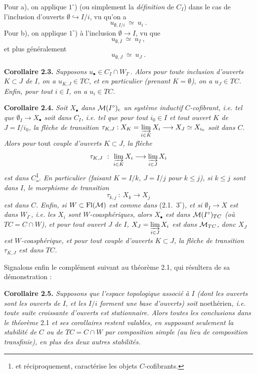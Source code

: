 Pour a), on applique $1^\circ$) (ou simplement la \textit{définition} de $C_I$) dans le cas de l'inclusion d'ouverts $\emptyset \hookrightarrow I/i$, vu qu'on a
\[
u_{\emptyset,I/i} \ \simeq\ u_i \ .
\]
Pour b), on applique $1^\circ$) à l'inclusion $\emptyset \longrightarrow I$, vu que
\[
u_{\emptyset,I} \ \simeq\ u_I \ ,
\]
et plus généralement
\[
u_{\emptyset,J} \ \simeq\ u_J \ .
\]

\textbf{Corollaire 2.3.} \textit{Supposons $u_\bullet \in C_I \cap W_{I^\circ}$. Alors pour toute inclusion d'ouverts $K \subset J$ de $I$, on a $u_{K,J} \in TC$, et en particulier (prenant $K = \emptyset$), on a $u_J \in TC$. Enfin, pour tout $i \in I$, on a $u_i \in TC$.}

\textbf{Corollaire 2.4.} \textit{Soit $X_\bullet$ dans $\mathcal{M}(I^\circ)_{\mathrm{c}}$ un système inductif $C$-cofibrant, i.e. tel que $\emptyset_I \longrightarrow X_\bullet$ soit dans $C_I$, i.e. tel que pour tout $i_0 \in I$ et tout ouvert $K$ de $J = I/i_0$, la flèche de transition $\tau_{K,J} : X_K = \varinjlim\limits_{i\in K} X_i \longrightarrow X_J \simeq X_{i_0}$ soit dans $C$. Alors pour} \textup{tout} \textit{couple d'ouverts $K \subset J$, la flèche}
\[
\tau_{K,J} \ :\ \varinjlim_{i\in K} X_i \longrightarrow \varinjlim_{i\in J} X_i
\]
\textit{est dans $C$}\footnote[12]{et réciproquement, caractérise les objets $C$-cofibrants.}\textit{. En particulier (faisant $K = I/k$, $J = I/j$ pour $k \leq j$), si $k \leq j$ sont dans $I$, le morphisme de transition}
\[
\tau_{k,j} \ :\ X_k \longrightarrow X_j
\]
\textit{est dans $C$. Enfin, si $W \subset \mathrm{Fl}(\mathcal{M})$ est comme dans} \textup{(2.1.\ $3^\circ$)}\textit{, et si $\emptyset_I \longrightarrow X$ est dans $W_{I^\circ}$, i.e. les $X_i$ sont $W$-coasphériques, alors $X_\bullet$ est dans $\mathcal{M}(I^\circ)_{TC}$ (où $TC = C \cap W$), et pour tout ouvert $J$ de $I$, $X_J = \varinjlim\limits_{i\in J} X_i$ est dans $\mathcal{M}_{TC}$, donc $X_J$ est $W$-coasphérique, et pour tout couple d'ouverts $K \subset J$, la flèche de transition $\tau_{K,J}$ est dans $TC$.}

Signalons enfin le complément suivant au théorème 2.1, qui résultera de sa démonstration :

\textbf{Corollaire 2.5.} \textit{Supposons que l'espace topologique associé à $I$ (dont les ouverts sont les ouverts de $I$, et les $I/i$ forment une base d'ouverts) soit} \textup{noethérien}\textit{, i.e. toute suite croissante d'ouverts est stationnaire. Alors toutes les conclusions dans le théorème} \textup{2.1} \textit{et ses corollaires restent valables, en supposant seulement la stabilité de $C$ ou de $TC = C \cap W$ par composition simple (au lieu de composition transfinie), en plus des deux autres stabilités.}

